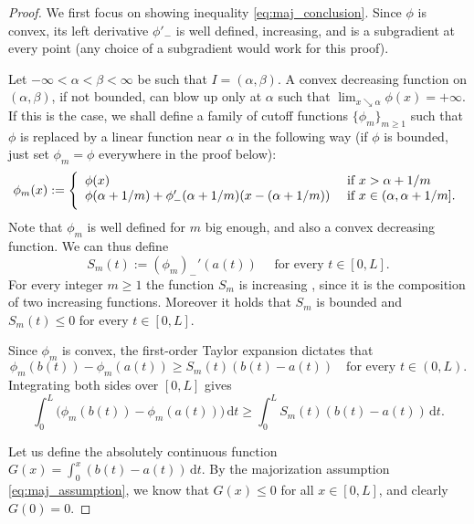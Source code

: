 \documentclass[10pt,leqno]{amsart}
\newcommand{\dd}{\, \mathrm{d}}
\numberwithin{Theorem}{section}
\theoremstyle{definition}
\theoremstyle{remark}
\numberwithin{equation}{section}
\numberwithin{equation}{section}
\begin{document}
\begin{proof} We first focus on showing inequality \eqref{eq:maj_conclusion}.
Since $\phi$ is convex, its left derivative $\phi'_-$ is well defined, increasing, and is a subgradient at every point (any choice of a subgradient would work for this proof).

Let $-\infty<\alpha<\beta<\infty$ be such that $I=(\alpha,\beta).$ A convex decreasing function on $(\alpha,\beta)$, if not bounded, can blow up only at $\alpha$ such that $\lim_{x\searrow \alpha}\phi(x)=+\infty.$ If this is the case, we shall define a family of cutoff functions $\{\phi_m\}_{m\geq 1}$ such that $\phi$ is replaced by a linear function near $\alpha$ in the following way (if $\phi$ is bounded, just set $\phi_m=\phi$ everywhere in the proof below):
$$
  \phi_m(x):=\left\{
  \begin{array}{ll}
    \phi(x) & \text{ if }x> \alpha+1/m
    \\
    \smallskip
    \phi(\alpha+1/m)+\phi_-'(\alpha+1/m)(x-(\alpha+1/m)) & \text{ if }x\in (\alpha,\alpha+1/m].
  \end{array}\right. 
$$
Note that $\phi_m$ is well defined for $m$ big enough, and also a convex decreasing function. We can thus define
$$
  S_m(t):=\left(\phi_m\right)_-'(a(t))\quad\text{ for every }t\in[0,L].
$$
For every integer $m\geq 1$  the function $S_m$  is  increasing , since it is the composition of two increasing functions. Moreover it holds that $S_m$ is bounded and $S_m(t)\leq 0$ for every $t\in [0,L].$  

Since $\phi_m$ is convex, the first-order Taylor expansion dictates that
\begin{equation}
\label{eq:gy:a is b if phi strict}
\phi_m(b(t)) - \phi_m(a(t)) \ge S_m(t) (b(t) - a(t)) \quad \text{for  every } t \in (0, L).
\end{equation}
Integrating both sides over $[0, L]$ gives
\begin{equation} \label{eq:maj_proof_1}
    \int_0^L \big( \phi_m(b(t)) - \phi_m(a(t)) \big) \dd t \ge \int_0^L S_m(t) (b(t) - a(t)) \dd t.
\end{equation}






Let us define the absolutely continuous function $G(x) = \int_0^x (b(t) - a(t)) \dd t$. By the majorization assumption \eqref{eq:maj_assumption}, we know that $G(x) \le 0$ for all $x \in [0, L]$, and clearly $G(0) = 0$. 



\end{proof}
\end{document}
